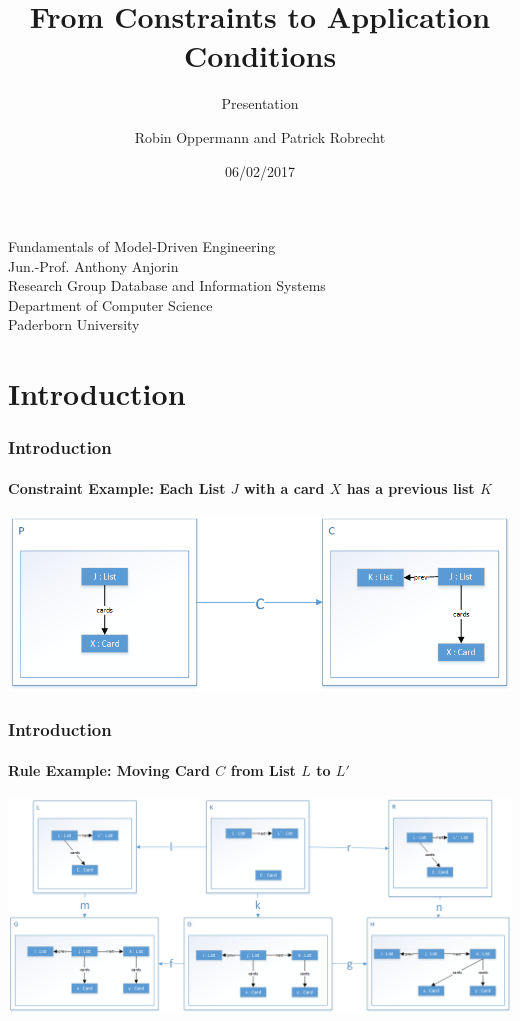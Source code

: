 \documentclass[32pt,t]{beamer}
\begin{document}
	\title{From Constraints to Application Conditions}
	\subtitle{Presentation}
	\date{06/02/2017}
	\author{Robin Oppermann and Patrick Robrecht}
	
	\begin{frame}
		\titlepage
		
		\begin{center}
			Fundamentals of Model-Driven Engineering \\
			Jun.-Prof. Anthony Anjorin \\
			Research Group Database and Information Systems \\
			Department of Computer Science \\
			Paderborn University
		\end{center}
	\end{frame}

\section{Introduction}
	\begin{frame}
		\frametitle{Introduction}
		\framesubtitle{Constraint Example: Each List $J$ with a card $X$ has a previous list $K$}
		\centering
		\includegraphics[width=\linewidth]{Images/01_Constraint_Example}
	\end{frame}

	\begin{frame}
		\frametitle{Introduction}
		\framesubtitle{Rule Example: Moving Card $C$ from List $L$ to $L'$}
		\centering
		\includegraphics[width=\linewidth]{Images/01_Rule_Example}
	\end{frame}
\end{document}
